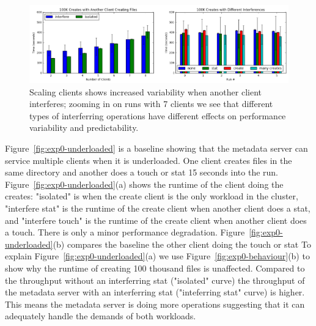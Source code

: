 \documentclass[preprint]{sigplanconf-eurosys}
\begin{document}
\begin{figure}[tb]
\centering
\includegraphics[width=180mm]{figures/runtime-consistency-scale.png}
\caption{Scaling clients shows increased variability when another client
interferes; zooming in on runs with 7 clients we see that different types of
interferring operations have different effects on performance variability and
predictability.  }\label{fig:runtime-consistency-scale}
\end{figure}

Figure~\ref{fig:exp0-underloaded} is a baseline showing that the metadata
server can service multiple clients when it is underloaded. One client creates
files in the same directory and another does a touch or stat 15 seconds into
the run. Figure~\ref{fig:exp0-underloaded}(a) shows the runtime of the client
doing the creates: "isolated" is when the create client is the only workload in
the cluster, "interfere stat" is the runtime of the create client when another
client does a stat, and "interfere touch" is the runtime of the create client
when another client does a touch. There is only a minor performance
degradation. Figure~\ref{fig:exp0-underloaded}(b) compares the baseline
the other client doing the touch or stat
%
%
%
%
%
To explain Figure~\ref{fig:exp0-underloaded}(a) we use
Figure~\ref{fig:exp0-behaviour}(b) to show why the runtime of creating 100
thousand files is unaffected. Compared to the throughput without an
interferring stat ("isolated" curve) the throughput of the metadata server with
an interferring stat ("inteferring stat" curve) is higher. This means the
metadata server is doing more operations suggesting that it can adequately
handle the demands of both workloads.  
\end{document}
